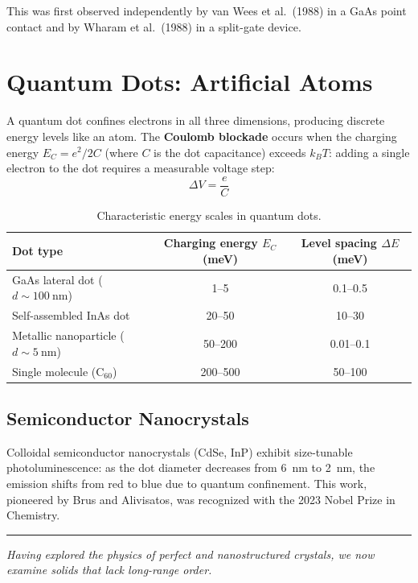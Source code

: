 This was first observed independently by van Wees et al.\ (1988) in a GaAs point contact and by Wharam et al.\ (1988) in a split-gate device.


\section{Quantum Dots: Artificial Atoms}

A quantum dot confines electrons in all three dimensions, producing discrete energy levels like an atom. The \textbf{Coulomb blockade} occurs when the charging energy $E_C = e^2/2C$ (where $C$ is the dot capacitance) exceeds $k_BT$: adding a single electron to the dot requires a measurable voltage step:
\begin{equation}
  \Delta V = \frac{e}{C}
\end{equation}

\begin{table}[H]
\centering
\caption{Characteristic energy scales in quantum dots.}
\label{tab:qdot}
\begin{tabular}{@{}lSS@{}}
\toprule
Dot type & {Charging energy $E_C$ (\si{\milli\electronvolt})} & {Level spacing $\Delta E$ (\si{\milli\electronvolt})} \\
\midrule
GaAs lateral dot ($d \sim \SI{100}{\nano\metre}$) & 1{--}5 & 0.1{--}0.5 \\
Self-assembled InAs dot & 20{--}50 & 10{--}30 \\
Metallic nanoparticle ($d \sim \SI{5}{\nano\metre}$) & 50{--}200 & 0.01{--}0.1 \\
Single molecule (C$_{60}$) & 200{--}500 & 50{--}100 \\
\bottomrule
\end{tabular}
\end{table}

\subsection{Semiconductor Nanocrystals}

Colloidal semiconductor nanocrystals (CdSe, InP) exhibit size-tunable photoluminescence: as the dot diameter decreases from \SI{6}{\nano\metre} to \SI{2}{\nano\metre}, the emission shifts from red to blue due to quantum confinement. This work, pioneered by Brus and Alivisatos, was recognized with the 2023 Nobel Prize in Chemistry.

\vspace{1cm}
\noindent\rule{\textwidth}{0.4pt}
\textit{Having explored the physics of perfect and nanostructured crystals, we now examine solids that lack long-range order.}
